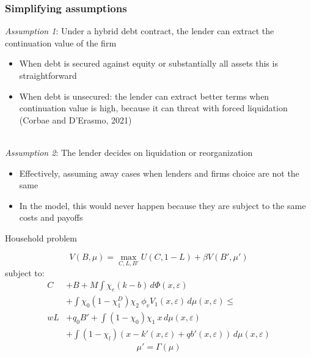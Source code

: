 \documentclass[notes]{beamer}
\begin{document}
\begin{frame}[label=hybrid] \frametitle{Simplifying assumptions}


\textit{Assumption 1}: Under a hybrid debt contract, the lender can extract the continuation value of the firm
\begin{itemize} \setlength\itemsep{0em}
    \item When debt is secured against equity or substantially all assets this is straightforward
    \item When debt is unsecured: the lender can extract better terms when continuation value is high, because it can threat with forced liquidation (Corbae and D'Erasmo, 2021)
\end{itemize} \vspace{3mm} \\
\textit{Assumption 2}: The lender decides on liquidation or reorganization
\begin{itemize} \setlength\itemsep{0em}
    \item Effectively, assuming away cases when lenders and firms choice are not the same
    \item In the model, this would never happen because they are subject to the same costs and payoffs
\end{itemize}

\begin{center}
\hyperlink{timing}{}
\end{center}

\end{frame}


\begin{frame}[label = HH problem]{Household problem}

\begin{equation*} \label{eq:U_max}
V(B, \mu) = \max_{C,L,B'} U(C, 1-L) + \beta V(B', \mu')
\end{equation*}  
subject to: 
\begin{equation*}
\begin{aligned}
C &+ B + M \int  \chi_e (k-b) \, d \Phi(x,\varepsilon) \\
&+ \int \chi_0 (1-\chi_1^D) \chi_2 \ \phi_v V_1(x,\varepsilon) \, d \mu(x,\varepsilon) \leq \\
wL &+ q_0 B' + \int (1 - \chi_0) \chi_1 \ x \, d \mu(x,\varepsilon) \\
&+ \int (1-\chi_l) \left( x - k'(x,\varepsilon) + qb'(x,\varepsilon) \right) \, d \mu(x,\varepsilon)
\end{aligned}
\end{equation*} 
$$\mu' = \Gamma(\mu)$$

\begin{center}
\hyperlink{HH}{}
\end{center}
\end{frame}
\end{document}
